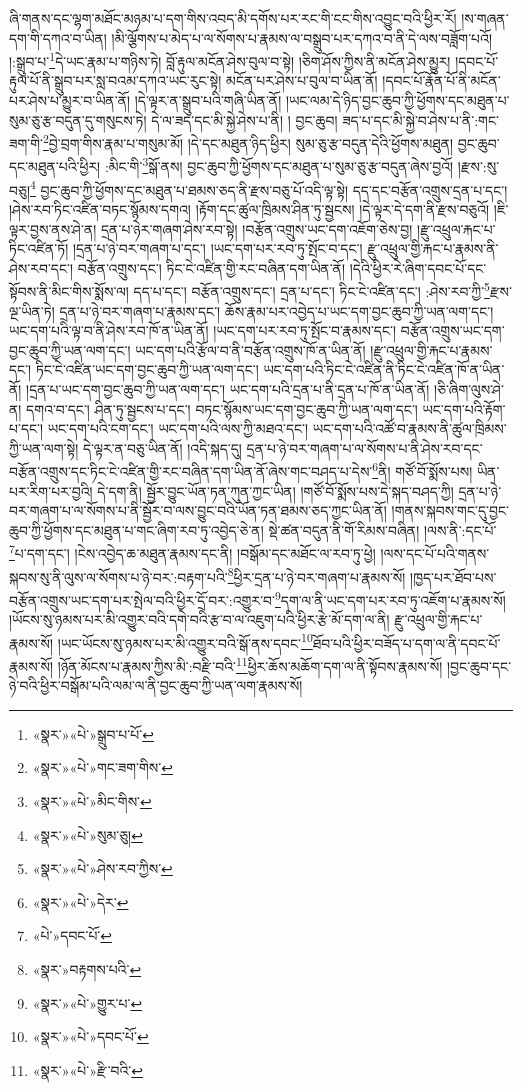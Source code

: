 ཞི་གནས་དང་ལྷག་མཐོང་མཉམ་པ་དག་གིས་འབད་མི་དགོས་པར་རང་གི་ངང་གིས་འབྱུང་བའི་ཕྱིར་རོ། །ས་གཞན་དག་གི་དཀའ་བ་ཡིན། །མི་ལྕོགས་པ་མེད་པ་ལ་སོགས་པ་རྣམས་ལ་བསྒྲུབ་པར་དཀའ་བ་ནི་དེ་ལས་བཟློག་པའོ། །:སྒྲུབ་པ་\footnote{«སྣར་»«པེ་»སྒྲུབ་པ་པོ་}དེ་ཡང་རྣམ་པ་གཉིས་ཏེ། བློ་རྟུལ་མངོན་ཤེས་བུལ་བ་སྟེ། །ཅིག་ཤོས་ཀྱིས་ནི་མངོན་ཤེས་མྱུར། །དབང་པོ་རྟུལ་པོ་ནི་སྒྲུབ་པར་སླ་བའམ་དཀའ་ཡང་རུང་སྟེ། མངོན་པར་ཤེས་པ་བུལ་བ་ཡིན་ནོ། །དབང་པོ་རྣོན་པོ་ནི་མངོན་པར་ཤེས་པ་མྱུར་བ་ཡིན་ནོ། །དེ་ལྟར་ན་སྒྲུབ་པའི་གཞི་ཡིན་ནོ། །ཡང་ལམ་དེ་ཉིད་བྱང་ཆུབ་ཀྱི་ཕྱོགས་དང་མཐུན་པ་སུམ་ཅུ་རྩ་བདུན་དུ་གསུངས་ཏེ། དེ་ལ་ཟད་དང་མི་སྐྱེ་ཤེས་པ་ནི། །
བྱང་ཆུབ། ཟད་པ་དང་མི་སྐྱེ་བ་ཤེས་པ་ནི་:གང་ཟག་གི་\footnote{«སྣར་»«པེ་»གང་ཟག་གིས་}བྱེ་བྲག་གིས་རྣམ་པ་གསུམ་མོ། །དེ་དང་མཐུན་ཉིད་ཕྱིར། སུམ་ཅུ་རྩ་བདུན་དེའི་ཕྱོགས་མཐུན། བྱང་ཆུབ་དང་མཐུན་པའི་ཕྱིར། :མིང་གི་\footnote{«སྣར་»«པེ་»མིང་གིས་}སྒོ་ནས། བྱང་ཆུབ་ཀྱི་ཕྱོགས་དང་མཐུན་པ་སུམ་ཅུ་རྩ་བདུན་ཞེས་བྱའོ། །རྫས་:སུ་བཅུ།\footnote{«སྣར་»«པེ་»སུམ་ཅུ།} བྱང་ཆུབ་ཀྱི་ཕྱོགས་དང་མཐུན་པ་ཐམས་ཅད་ནི་རྫས་བཅུ་པོ་འདི་ལྟ་སྟེ། དད་དང་བརྩོན་འགྲུས་དྲན་པ་དང་། །ཤེས་རབ་ཏིང་འཛིན་བཏང་སྙོམས་དགའ། །རྟོག་དང་ཚུལ་ཁྲིམས་ཤིན་ཏུ་སྦྱངས། །དེ་ལྟར་དེ་དག་ནི་རྫས་བཅུའོ། །ཇི་ལྟར་བྱས་ནས་ཤེ་ན། དྲན་པ་ཉེར་གཞག་ཤེས་རབ་སྟེ། །བརྩོན་འགྲུས་ཡང་དག་འཇོག་ཅེས་བྱ། །རྫུ་འཕྲུལ་རྐང་པ་ཏིང་འཛིན་ཏོ། །དྲན་པ་ཉེ་བར་གཞག་པ་དང་། །ཡང་དག་པར་རབ་ཏུ་སྤོང་བ་དང་། རྫུ་འཕྲུལ་གྱི་རྐང་པ་རྣམས་ནི་ཤེས་རབ་དང་། བརྩོན་འགྲུས་དང་། ཏིང་ངེ་འཛིན་གྱི་རང་བཞིན་དག་ཡིན་ནོ། །དེའི་ཕྱིར་རེ་ཞིག་དབང་པོ་དང་སྟོབས་ནི་མིང་གིས་སྨོས་ལ། དད་པ་དང་། བརྩོན་འགྲུས་དང་། དྲན་པ་དང་། ཏིང་ངེ་འཛིན་དང་། :ཤེས་རབ་ཀྱི་\footnote{«སྣར་»«པེ་»ཤེས་རབ་ཀྱིས་}རྫས་ལྔ་ཡིན་ཏེ། དྲན་པ་ཉེ་བར་གཞག་པ་རྣམས་དང་། ཆོས་རྣམ་པར་འབྱེད་པ་ཡང་དག་བྱང་ཆུབ་ཀྱི་ཡན་ལག་དང་། ཡང་དག་པའི་ལྟ་བ་ནི་ཤེས་རབ་ཁོ་ན་ཡིན་ནོ། །ཡང་དག་པར་རབ་ཏུ་སྤོང་བ་རྣམས་དང་། བརྩོན་འགྲུས་ཡང་དག་བྱང་ཆུབ་ཀྱི་ཡན་ལག་དང་། ཡང་དག་པའི་རྩོལ་བ་ནི་བརྩོན་འགྲུས་ཁོ་ན་ཡིན་ནོ། །རྫུ་འཕྲུལ་གྱི་རྐང་པ་རྣམས་དང་། ཏིང་ངེ་འཛིན་ཡང་དག་བྱང་ཆུབ་ཀྱི་ཡན་ལག་དང་། ཡང་དག་པའི་ཏིང་ངེ་འཛིན་ནི་ཏིང་ངེ་འཛིན་ཁོ་ན་ཡིན་ནོ། །དྲན་པ་ཡང་དག་བྱང་ཆུབ་ཀྱི་ཡན་ལག་དང་། ཡང་དག་པའི་དྲན་པ་ནི་དྲན་པ་ཁོ་ན་ཡིན་ནོ། །ཅི་ཞིག་ལུས་ཤེ་ན། དགའ་བ་དང་། ཤིན་ཏུ་སྦྱངས་པ་དང་། བཏང་སྙོམས་ཡང་དག་བྱང་ཆུབ་ཀྱི་ཡན་ལག་དང་། ཡང་དག་པའི་རྟོག་པ་དང་། ཡང་དག་པའི་ངག་དང་། ཡང་དག་པའི་ལས་ཀྱི་མཐའ་དང་། ཡང་དག་པའི་འཚོ་བ་རྣམས་ནི་ཚུལ་ཁྲིམས་ཀྱི་ཡན་ལག་སྟེ། དེ་ལྟར་ན་བཅུ་ཡིན་ནོ། །འདི་སྐད་དུ། དྲན་པ་ཉེ་བར་གཞག་པ་ལ་སོགས་པ་ནི་ཤེས་རབ་དང་བརྩོན་འགྲུས་དང་ཏིང་ངེ་འཛིན་གྱི་རང་བཞིན་དག་ཡིན་ནོ་ཞེས་གང་བཤད་པ་དེས་\footnote{«སྣར་»«པེ་»དེར་}ནི། གཙོ་བོ་སྨོས་པས། ཡིན་པར་རིག་པར་བྱའི། དེ་དག་ནི། སྦྱོར་བྱུང་ཡོན་ཏན་ཀུན་ཀྱང་ཡིན། །གཙོ་བོ་སྨོས་པས་དེ་སྐད་བཤད་ཀྱི། དྲན་པ་ཉེ་བར་གཞག་པ་ལ་སོགས་པ་ནི་སྦྱོར་བ་ལས་བྱུང་བའི་ཡོན་ཏན་ཐམས་ཅད་ཀྱང་ཡིན་ནོ། །གནས་སྐབས་གང་དུ་བྱང་ཆུབ་ཀྱི་ཕྱོགས་དང་མཐུན་པ་གང་ཞིག་རབ་ཏུ་འབྱེད་ཅེ་ན། སྡེ་ཚན་བདུན་ནི་གོ་རིམས་བཞིན། །ལས་ནི་:དང་པོ་\footnote{«པེ་»དབང་པོ་}པ་དག་དང་། །ངེས་འབྱེད་ཆ་མཐུན་རྣམས་དང་ནི། །བསྒོམ་དང་མཐོང་ལ་རབ་ཏུ་ཕྱེ། །ལས་དང་པོ་པའི་གནས་སྐབས་སུ་ནི་ལུས་ལ་སོགས་པ་ཉེ་བར་:བརྟག་པའི་\footnote{«སྣར་»བརྟགས་པའི་}ཕྱིར་དྲན་པ་ཉེ་བར་གཞག་པ་རྣམས་སོ། །ཁྱད་པར་ཐོབ་པས་བརྩོན་འགྲུས་ཡང་དག་པར་སྤེལ་བའི་ཕྱིར་དྲོ་བར་:འགྱུར་བ་\footnote{«སྣར་»«པེ་»གྱུར་པ་}དག་ལ་ནི་ཡང་དག་པར་རབ་ཏུ་འཇོག་པ་རྣམས་སོ། །ཡོངས་སུ་ཉམས་པར་མི་འགྱུར་བའི་དགེ་བའི་རྩ་བ་ལ་འཇུག་པའི་ཕྱིར་རྩེ་མོ་དག་ལ་ནི། རྫུ་འཕྲུལ་གྱི་རྐང་པ་རྣམས་སོ། །ཡང་ཡོངས་སུ་ཉམས་པར་མི་འགྱུར་བའི་སྒོ་ནས་དབང་\footnote{«སྣར་»«པེ་»དབང་པོ་}ཐོབ་པའི་ཕྱིར་བཟོད་པ་དག་ལ་ནི་དབང་པོ་རྣམས་སོ། །ཉོན་མོངས་པ་རྣམས་ཀྱིས་མི་:བརྫི་བའི་\footnote{«སྣར་»«པེ་»རྫི་བའི་}ཕྱིར་ཆོས་མཆོག་དག་ལ་ནི་སྟོབས་རྣམས་སོ། །བྱང་ཆུབ་དང་ཉེ་བའི་ཕྱིར་བསྒོམ་པའི་ལམ་ལ་ནི་བྱང་ཆུབ་ཀྱི་ཡན་ལག་རྣམས་སོ། 